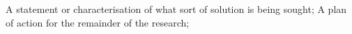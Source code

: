 A statement or characterisation of what sort of solution is being sought;
A plan of action for the remainder of the research;

